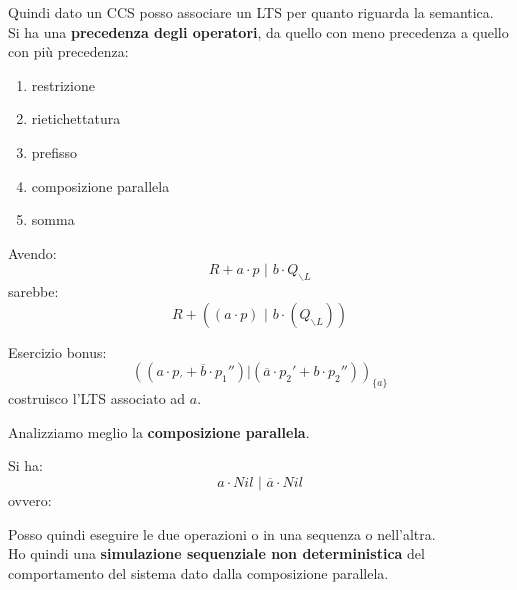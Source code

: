 \documentclass[a4paper,12pt, oneside]{book}
\begin{document}
Quindi dato un CCS posso associare un LTS per quanto riguarda la semantica.\\
Si ha una \textbf{precedenza degli operatori}, da quello con meno precedenza a
quello con più precedenza: 
\begin{enumerate}
  \item restrizione
  \item rietichettatura
  \item prefisso
  \item composizione parallela
  \item somma
\end{enumerate}
\begin{esempio}
  Avendo:
  \[R+a\cdot p\,\,|\,\,b\cdot Q_{\backslash L}\]
  sarebbe:
  \[R+((a\cdot p)\,\,|\,\,b\cdot(Q_{\backslash L}))\]
\end{esempio}
\begin{esempio}
  Esercizio bonus:
  \[((a\cdot p_'+\overline{b}\cdot p_1'')|(\overline{a}\cdot p_2'+b\cdot
    p_2''))_{\{a\}}\]
  costruisco l'LTS associato ad $a$.
\end{esempio}
Analizziamo meglio la \textbf{composizione parallela}.\\
\begin{esempio}
  Si ha:
  \[a\cdot Nil\,\,|\,\,\overline{a}\cdot Nil\]
  ovvero:
  \begin{center}
  \end{center}
  Posso quindi eseguire le due operazioni o in una sequenza o nell'altra.\\
  Ho quindi una \textbf{simulazione sequenziale non deterministica} del
  comportamento del sistema dato dalla composizione parallela.
\end{esempio}
\end{document}
